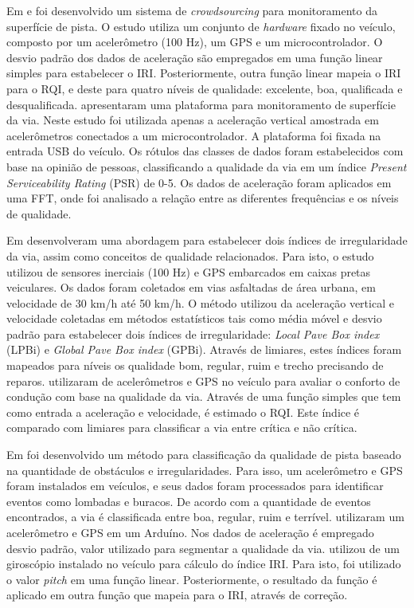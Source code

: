 Em \cite{Chen2013} e \cite{Chen2016} foi desenvolvido um sistema de \textit{crowdsourcing} para monitoramento da superfície de pista. O estudo utiliza um conjunto de \textit{hardware} fixado no veículo, composto por um acelerômetro (100 Hz), um GPS e um microcontrolador. O desvio padrão dos dados de aceleração são empregados em uma função linear simples para estabelecer o IRI. Posteriormente, outra função linear mapeia o IRI para o RQI, e deste para quatro níveis de qualidade: excelente, boa, qualificada e desqualificada. \cite{Lei2018} apresentaram uma plataforma para monitoramento de superfície da via. Neste estudo foi utilizada apenas a aceleração vertical amostrada em acelerômetros conectados a um microcontrolador. A plataforma foi fixada na entrada USB do veículo. Os rótulos das classes de dados foram estabelecidos com base na opinião de pessoas, classificando a qualidade da via em um índice \textit{Present Serviceability Rating} (PSR) de 0-5. Os dados de aceleração foram aplicados em uma FFT, onde foi analisado a relação entre as diferentes frequências e os níveis de qualidade.

Em \cite{Monica2021} desenvolveram uma abordagem para estabelecer dois índices de irregularidade da via, assim como conceitos de qualidade relacionados. Para isto, o estudo utilizou de sensores inerciais (100 Hz) e GPS embarcados em caixas pretas veiculares. Os dados foram coletados em vias asfaltadas de área urbana, em velocidade de 30 km/h até 50 km/h. O método utilizou da aceleração vertical e velocidade coletadas em métodos estatísticos tais como média móvel e desvio padrão para estabelecer dois índices de irregularidade: \textit{Local Pave Box index} (LPBi) e \textit{Global Pave Box index}  (GPBi). Através de limiares, estes índices foram mapeados para níveis os qualidade bom, regular, ruim e trecho precisando de reparos. \cite{Pont2017} utilizaram de acelerômetros e GPS no veículo para avaliar o conforto de condução com base na qualidade da via. Através de uma função simples que tem como entrada a aceleração e velocidade, é estimado o RQI. Este índice é comparado com limiares para classificar a via entre crítica e não crítica.

Em \cite{Hassan2019} foi desenvolvido um método para classificação da qualidade de pista baseado na quantidade de obstáculos e irregularidades. Para isso, um acelerômetro e GPS foram instalados em veículos, e seus dados foram processados para identificar eventos como lombadas e buracos. De acordo com a quantidade de eventos encontrados, a via é classificada entre boa, regular, ruim e terrível. \cite{Prapulla2017} utilizaram um acelerômetro e GPS em um Arduíno. Nos dados de aceleração é empregado desvio padrão, valor utilizado para segmentar a qualidade da via. \cite{Pitonak2016} utilizou de um giroscópio instalado no veículo para cálculo do índice IRI. Para isto, foi utilizado o valor \textit{pitch} em uma função linear. Posteriormente, o resultado da função é aplicado em outra função que mapeia para o IRI, através de correção.

